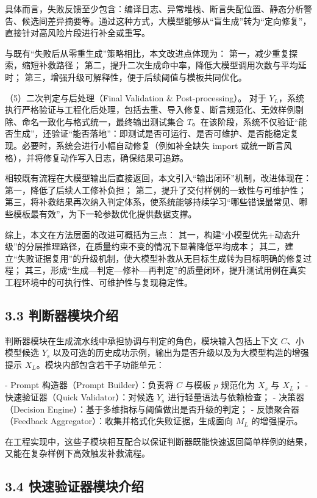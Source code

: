 具体而言，失败反馈至少包含：编译日志、异常堆栈、断言失配位置、静态分析警告、候选间差异摘要等。通过这种方式，大模型能够从“盲生成”转为“定向修复”，直接针对高风险片段进行补全或重写。

与既有“失败后从零重生成”策略相比，本文改进点体现为：
第一，减少重复探索，缩短补救路径；
第二，提升二次生成命中率，降低大模型调用次数与平均延时；
第三，增强升级可解释性，便于后续阈值与模板共同优化。

（5）二次判定与后处理（Final Validation \& Post-processing）。
对于 $Y_L$，系统执行严格验证与工程化后处理，包括去重、导入修复、断言规范化、无效样例剔除、命名一致化与格式统一，最终输出测试集合 $T$。在该阶段，系统不仅验证“能否生成”，还验证“能否落地”：即测试是否可运行、是否可维护、是否能稳定复现。必要时，系统会进行小幅自动修复（例如补全缺失 import 或统一断言风格），并将修复动作写入日志，确保结果可追踪。

相较既有流程在大模型输出后直接返回，本文引入“输出闭环”机制，改进体现在：
第一，降低了后续人工修补负担；
第二，提升了交付样例的一致性与可维护性；
第三，将补救结果再次纳入判定体系，使系统能够持续学习“哪些错误最常见、哪些模板最有效”，为下一轮参数优化提供数据支撑。

综上，本文在方法层面的改进可概括为三点：
其一，构建“小模型优先+动态升级”的分层推理路径，在质量约束不变的情况下显著降低平均成本；
其二，建立“失败证据复用”的升级机制，使大模型补救从无目标生成转为目标明确的修复过程；
其三，形成“生成—判定—修补—再判定”的质量闭环，提升测试用例在真实工程环境中的可执行性、可维护性与复现稳定性。

\subsection{3.3 判断器模块介绍}

判断器模块在生成流水线中承担协调与判定的角色，模块输入包括上下文 $C$、小模型候选 $Y_s$ 以及可选的历史成功示例，输出为是否升级以及为大模型构造的增强提示 $X_L$。模块内部包含若干子功能单元：

- Prompt 构造器（Prompt Builder）：负责将 $C$ 与模板 $p$ 规范化为 $X_s$ 与 $X_L$；
- 快速验证器（Quick Validator）：对候选 $Y_s$ 进行轻量语法与依赖检查；
- 决策器（Decision Engine）：基于多维指标与阈值做出是否升级的判定；
- 反馈聚合器（Feedback Aggregator）：收集并格式化失败证据，生成面向 $M_L$ 的增强提示。 

在工程实现中，这些子模块相互配合以保证判断器既能快速返回简单样例的结果，又能在复杂样例下高效触发补救流程。

\subsection{3.4 快速验证器模块介绍}

